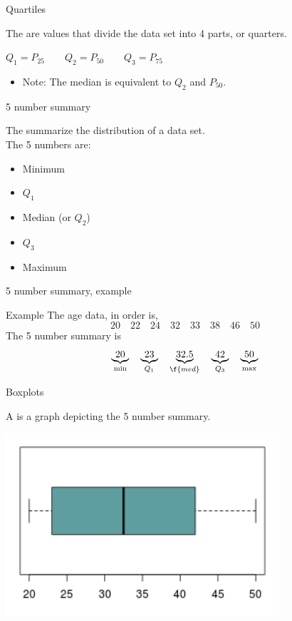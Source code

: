 \documentclass[xcolor=table]{beamer}
\begin{document}
\begin{frame}{Quartiles}
\begin{block}{}
\large
The  are values that divide the data set into 4 parts, or quarters.\\
\smallskip
{\centering
$Q_1 = P_{25} \qquad Q_2 = P_{50} \qquad Q_3 = P_{75}$
\par}
\begin{itemize}
\pause
\item Note: The median is equivalent to $Q_2$ and $P_{50}$.
\end{itemize}
\end{block}
\end{frame}

\begin{frame}{5 number summary}
\begin{block}{}
\large 
The  summarize the distribution of a data set.\\
\medskip
The 5 numbers are:
\begin{itemize}
\item Minimum
\item $Q_1$
\item Median (or $Q_2$)
\item $Q_3$
\item Maximum
\end{itemize}
\end{block}
\end{frame}

\begin{frame}{5 number summary, example}
\begin{exampleblock}{Example}
The age data, in order is, 
\[20 \quad 22 \quad 24 \quad 32 \quad 33 \quad 38 \quad 46 \quad 50 \]
The 5 number summary is
\[\underbrace{20}_{\min} \quad \underbrace{23}_{Q_1} \quad \underbrace{32.5}_{\f{med}} \quad \underbrace{42}_{Q_3} \quad \underbrace{50}_{\max}\]
\end{exampleblock}
\end{frame}

\begin{frame}{Boxplots}
\begin{block}{}
\large
A  is a graph depicting the 5 number summary.
\end{block}
{\centering
\includegraphics[width=4in]{../images/ch03_boxplot}\par
}
\end{frame}
\end{document}
